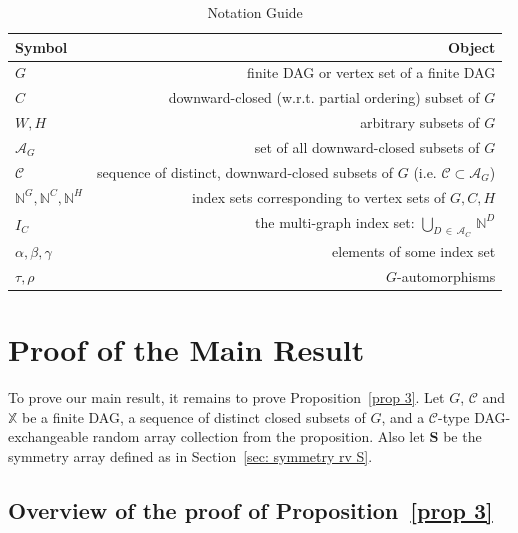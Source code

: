 \documentclass[10pt]{amsart}
\theoremstyle{definition}\newtheorem{defi}[theo]{Definition}\newtheorem{rema}[theo]{Remark}\newtheorem{exam}[theo]{Example}\newtheorem{exem}[theo]{Example}\newtheorem{nota}[theo]{Notation}
\newcommand*\X{\mathbb{X}}
\newcommand*\N{\mathbb{N}}
\renewcommand{\AA}{\mathcal{A}}
\newcommand*\CC{{\mathcal{C}}}
\newcommand*\bS{\mathbf{S}}
\begin{document}
\begin{table}[t]
\begin{center}
\caption{Notation Guide}\label{tab:table1}
\begin{tabular}{l|r}
Symbol & Object \\
\hline $G$& finite DAG or vertex set of a finite DAG \\
$C$& downward-closed (w.r.t. partial ordering) subset of $G$ \\
$W, H$& arbitrary subsets of $G$ \\
$\AA_G$& set of all downward-closed subsets of $G$\\
$\CC$& sequence of {distinct}, downward-closed subsets of $G$ (i.e. $\CC\subset\AA_G$)\\
$\N^G, \N^C, \N^H$ & index sets corresponding to vertex sets of $G,C,H$\\
$I_C$& the multi-graph index set: $\bigcup_{D\,\in\, \AA_C}\,\N^D$\\
$\alpha, \beta, \gamma$ & elements of some index set \\
$\tau, \rho$ & $G$-automorphisms \\
\end{tabular}
\end{center}
\end{table}


\section{Proof of the Main Result}\label{sec:proof}
To prove our main result, it remains to prove Proposition~\ref{prop 3}. Let $G$, $\CC$ and $\X$ be a finite DAG, a sequence of distinct closed subsets of $G$, and a $\CC$-type DAG-exchangeable random array collection from the proposition. Also let $\bS$ be {the symmetry array} defined as in Section~\ref{sec: symmetry rv S}.




\subsection*{Overview of the proof of Proposition~\ref{prop 3}}
\end{document}
